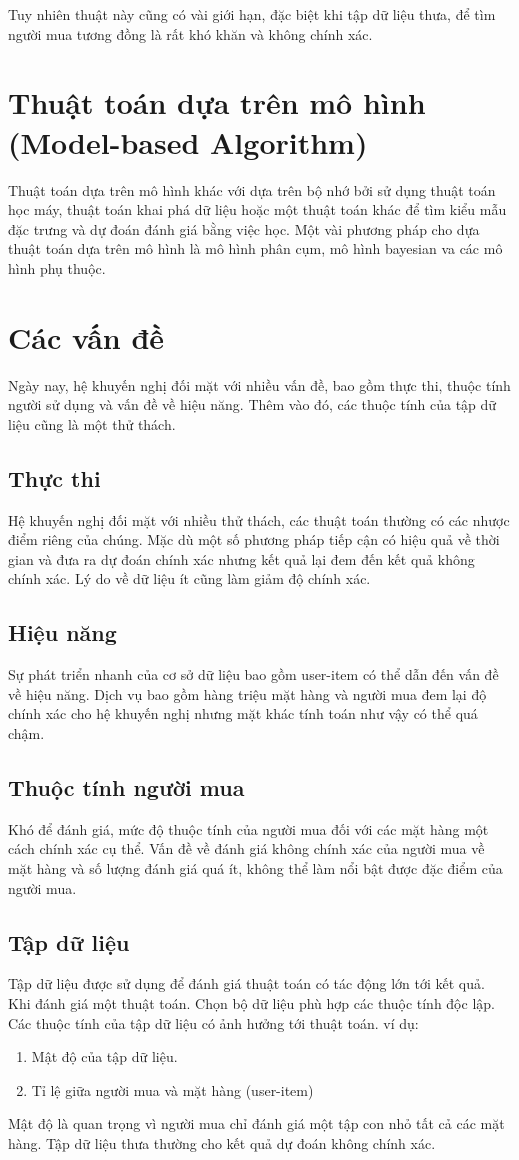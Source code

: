 Tuy nhiên thuật này cũng có vài giới hạn, đặc biệt khi tập dữ liệu thưa, để tìm người mua tương đồng là rất khó khăn và không chính xác.

\section{Thuật toán dựa trên mô hình (Model-based Algorithm)}
Thuật toán dựa trên mô hình khác với dựa trên bộ nhớ bởi sử dụng thuật toán học máy, thuật toán khai phá dữ liệu hoặc một thuật toán khác để tìm kiểu mẫu đặc trưng và dự đoán đánh giá bằng việc học. Một vài phương pháp cho dựa thuật toán dựa trên mô hình là mô hình phân cụm, mô hình bayesian va các mô hình phụ thuộc.

\section{Các vấn đề}
Ngày nay, hệ khuyến nghị đối mặt với nhiều vấn đề, bao gồm thực thi, thuộc tính người sử dụng và vấn đề về hiệu năng. Thêm vào đó, các thuộc tính của tập dữ liệu cũng là một thử thách.
\subsection{Thực thi}
Hệ khuyến nghị đối mặt với nhiều thử thách, các thuật toán thường có các nhược điểm riêng của chúng. Mặc dù một số phương pháp tiếp cận có hiệu quả về thời gian và đưa ra dự đoán chính xác nhưng kết quả lại đem đến kết quả không chính xác. Lý do về dữ liệu ít cũng làm giảm độ chính xác.
\subsection{Hiệu năng}
Sự phát triển nhanh của cơ sở dữ liệu bao gồm user-item có thể dẫn đến vấn đề về hiệu năng. Dịch vụ bao gồm hàng triệu mặt hàng và người mua đem lại độ chính xác cho hệ khuyến nghị nhưng mặt khác tính toán như vậy có thể quá chậm.
\subsection{Thuộc tính người mua}
Khó để đánh giá, mức độ thuộc tính của người mua đối với các mặt hàng một cách chính xác cụ thể. Vấn đề về đánh giá không chính xác của người mua về mặt hàng và số lượng đánh giá quá ít, không thể làm nổi bật được đặc điểm của người mua.
\subsection{Tập dữ liệu}
Tập dữ liệu được sử dụng để đánh giá thuật toán có tác động lớn tới kết quả. Khi đánh giá một thuật toán. Chọn bộ dữ liệu phù hợp các thuộc tính độc lập. Các thuộc tính của tập dữ liệu có ảnh hưởng tới thuật toán. ví dụ:
\begin{enumerate}[1.]
	\item Mật độ của tập dữ liệu.
	\item Tỉ lệ giữa người mua và mặt hàng (user-item)
\end{enumerate}
Mật độ là quan trọng vì người mua chỉ đánh giá một tập con nhỏ tất cả các mặt hàng. Tập dữ liệu thưa thường cho kết quả dự đoán không chính xác.
